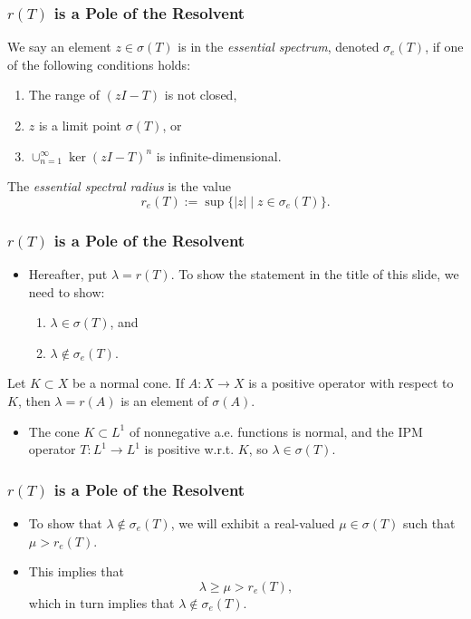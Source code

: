 \documentclass{beamer}
\begin{document}
\begin{frame}
	\frametitle{$r(T)$ is a Pole of the Resolvent}
	\begin{definition}
		We say an element $z \in \sigma(T)$ is in the \emph{essential spectrum}, denoted $\sigma_e(T)$, if one of the following conditions holds:
		\begin{enumerate}
			\pause
			\item The range of $(zI - T)$ is not closed,
			\pause
			\item $z$ is a limit point $\sigma(T)$, or
			\pause
			\item $\cup_{n=1}^\infty \ker(zI - T)^n$ is infinite-dimensional.
		\end{enumerate}
			\pause
			The \emph{essential spectral radius} is the value
			\[r_e(T) := \sup\{|z| \mid z \in \sigma_e(T)\}.\]
	\end{definition}
\end{frame}

\begin{frame}
	\frametitle{$r(T)$ is a Pole of the Resolvent}
	\begin{itemize}
		\item Hereafter, put $\lambda = r(T)$. To show the statement in the title of this slide, we need to show:
		\begin{enumerate}
			\pause
			\item $\lambda \in \sigma(T)$, and
			\pause
			\item $\lambda \not \in \sigma_e(T)$.
		\end{enumerate}
	\end{itemize}
	\pause
	\begin{theorem}
		Let $K \subset X$ be a normal cone. If $A:X \to X$ is a positive operator with respect to $K$, then $\lambda = r(A)$ is an element of $\sigma(A)$.
	\end{theorem}
	\pause
	\begin{itemize}
		\item The cone $K \subset L^1$ of nonnegative a.e. functions is normal, and the IPM operator $T:L^1 \to L^1$ is positive w.r.t. $K$, so $\lambda \in \sigma(T)$.
	\end{itemize}
\end{frame}

\begin{frame}
	\frametitle{$r(T)$ is a Pole of the Resolvent}
	\begin{itemize}
		\item To show that $\lambda \not \in \sigma_e(T)$, we will exhibit a real-valued $\mu \in \sigma(T)$ such that $\mu > r_e(T)$.
		\pause
		\item This implies that
		\[\lambda \geq \mu > r_e(T),\]
		\pause
		which in turn implies that $\lambda \not \in \sigma_e(T)$.
	\end{itemize}
\end{frame}
\end{document}
